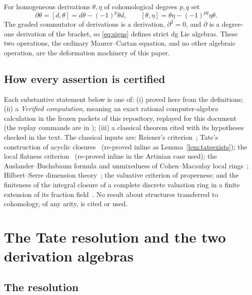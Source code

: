 \documentclass[11pt]{article}
\theoremstyle{definition}
\theoremstyle{remark}
\begin{document}
For homogeneous derivations $\theta,\eta$ of cohomological degrees $p,q$ set
\[
 \partial\theta=[d,\theta]=d\theta-(-1)^p\theta d,
 \qquad
 [\theta,\eta]=\theta\eta-(-1)^{pq}\eta\theta.
\tag{1.2}\label{eq:signs}
\]
The graded commutator of derivations is a derivation, $\partial^2=0$, and
$\partial$ is a degree-one derivation of the bracket, so \eqref{eq:signs}
defines strict dg Lie algebras.  These two operations, the ordinary
Maurer--Cartan equation, and no other algebraic operation, are the
deformation machinery of this paper.

\subsection{How every assertion is certified}

Each substantive statement below is one of: (i) proved here from the
definitions; (ii) a \emph{Verified computation}, meaning an exact rational
computer-algebra calculation in the frozen packets of this repository,
replayed for this document (the replay commands are in
); (iii) a classical theorem cited with its hypotheses
checked in the text.  The classical inputs are: Reisner's
criterion~\cite{Reisner}; Tate's construction of acyclic
closures~\cite{Tate,Avramov} (re-proved inline as
Lemma~\ref{lem:tateexists}); the local flatness
criterion~\cite[Tag 00MK]{Stacks00MK} (re-proved inline in the Artinian case
used); the Auslander--Buchsbaum formula and unmixedness of Cohen--Macaulay
local rings~\cite{BH}; Hilbert--Serre dimension theory~\cite{BH}; the
valuative criterion of properness; and the finiteness of the integral
closure of a complete discrete valuation ring in a finite extension of its
fraction field~\cite[Ch.~II]{SerreLF}.  No result about structures
transferred to cohomology, of any arity, is cited or used.

\section{The Tate resolution and the two derivation algebras}
\label{sec:controller}

\subsection{The resolution}
\end{document}
